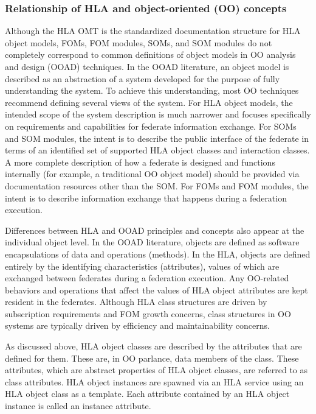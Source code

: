 \subsubsection{Relationship of HLA and object-oriented (OO) concepts}

Although the HLA OMT is the standardized documentation structure for HLA object models, FOMs, FOM modules, SOMs, and SOM modules do not completely correspond to common definitions of object models in OO analysis and design (OOAD) techniques. In the OOAD literature, an object model is described as an abstraction of a system developed for the purpose of fully understanding the system. To achieve this understanding, most OO techniques recommend defining several views of the system. For HLA object models, the intended scope of the system description is much narrower and focuses specifically on requirements and capabilities for federate information exchange. For SOMs and SOM modules, the intent is to describe the public interface of the federate in terms of an identified set of supported HLA object classes and interaction classes. A more complete description of how a federate is designed and functions internally (for example, a traditional OO object model) should be provided via documentation resources other than the SOM. For FOMs and FOM modules, the intent is to describe information exchange that happens during a federation execution.

Differences between HLA and OOAD principles and concepts also appear at the individual object level. In the OOAD literature, objects are defined as software encapsulations of data and operations (methods). In the HLA, objects are defined entirely by the identifying characteristics (attributes), values of which are exchanged between federates during a federation execution. Any OO-related behaviors and operations that affect the values of HLA object attributes are kept resident in the federates. Although HLA class structures are driven by subscription requirements and FOM growth concerns, class structures in OO systems are typically driven by efficiency and maintainability concerns.

\clearpage
As discussed above, HLA object classes are described by the attributes that are defined for them. These are, in OO parlance, data members of the class. These attributes, which are abstract properties of HLA object classes, are referred to as class attributes. HLA object instances are spawned via an HLA service using an HLA object class as a template. Each attribute contained by an HLA object instance is called an instance attribute.

